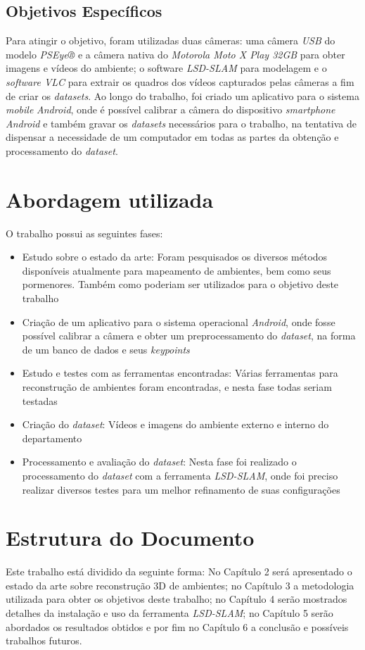 \subsection{Objetivos Específicos}

Para atingir o objetivo, foram utilizadas duas câmeras: uma câmera \textit{USB} do modelo \textit{PSEye®} e a câmera nativa do  \textit{Motorola Moto X Play 32GB} para obter imagens e vídeos do ambiente; o software \textit{LSD-SLAM} \cite{LSD-SLAM-Artigo} para modelagem e o \textit{software VLC} para extrair os quadros dos vídeos capturados pelas câmeras a fim de criar os \textit{datasets}. Ao longo do trabalho, foi criado um aplicativo para o sistema \textit{mobile} \textit{Android}, onde é possível calibrar a câmera do dispositivo \textit{smartphone Android} e também gravar os \textit{datasets} necessários para o trabalho, na tentativa de dispensar a necessidade de um computador em todas as partes da obtenção e processamento do \textit{dataset}.


\section{Abordagem utilizada}

O trabalho possui as seguintes fases:
\begin{itemize}
\item{Estudo sobre o estado da arte: Foram pesquisados os diversos métodos disponíveis atualmente para mapeamento de ambientes, bem como seus pormenores. Também como  poderiam ser utilizados para o objetivo deste trabalho}
\item{Criação de um aplicativo para o sistema operacional \textit{Android}, onde fosse possível calibrar a câmera e obter um preprocessamento do \textit{dataset}, na forma de um banco de dados e seus \textit{keypoints}}
\item{Estudo e testes com as ferramentas encontradas: Várias ferramentas para reconstrução de ambientes foram encontradas, e nesta fase todas seriam testadas}
\item{Criação do \textit{dataset}: Vídeos e imagens do ambiente externo e interno do departamento}
\item{Processamento e avaliação do \textit{dataset}: Nesta fase foi realizado o processamento do \textit{dataset} com a ferramenta \textit{LSD-SLAM}, onde foi preciso realizar diversos testes para um melhor refinamento de suas configurações}
\end{itemize}


\section{Estrutura do Documento}


Este trabalho está dividido da seguinte forma: No Capítulo 2 será apresentado o estado da arte sobre reconstrução 3D de ambientes; no Capítulo 3 a metodologia utilizada para obter os objetivos deste trabalho; no Capítulo 4 serão mostrados detalhes da instalação e uso da ferramenta \textit{LSD-SLAM}; no Capítulo 5 serão abordados os resultados obtidos e por fim no Capítulo 6 a conclusão e possíveis trabalhos futuros.

